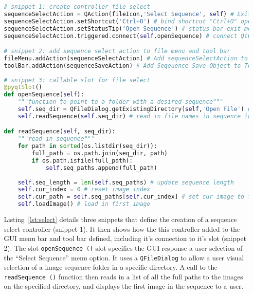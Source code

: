 \begin{lstlisting}[language=Python, caption={Code listing detailing sequence selection controller and connection to slot}, captionpos=b, label={lst:select}]
# snippet 1: create controller file select 
sequenceSelectAction = QAction(fileIcon,'Select Sequence', self) # Exit Action Object
sequenceSelectAction.setShortcut('Ctrl+O') # bind shortcut "Ctrl+O" open file
sequenceSelectAction.setStatusTip('Open Sequence') # status bar exit message
sequenceSelectAction.triggered.connect(self.openSequence) # connect QtGui quit() method 

# snippet 2: add sequence select action to file menu and tool bar
fileMenu.addAction(sequenceSelectAction) # Add sequenceSelectAction to fileMenu 
toolBar.addAction(sequenceSaveAction) # Add Seqeuence Save Object to Tool Bar
    
# snippet 3: callable slot for file select
@pyqtSlot()
def openSequence(self):
    """function to point to a folder with a desired sequence"""
    self.seq_dir = QFileDialog.getExistingDirectory(self,'Open File') # store path to sequence
    self.readSequence(self.seq_dir) # read in file names in sequence into self.paths

def readSequence(self, seq_dir):
    """read in sequence"""
    for path in sorted(os.listdir(seq_dir)):
        full_path = os.path.join(seq_dir, path)
        if os.path.isfile(full_path):
            self.seq_paths.append(full_path)
    
    self.seq_length = len(self.seq_paths) # update sequence length
    self.cur_index = 0 # reset image index
    self.cur_path = self.seq_paths[self.cur_index] # set cur image to first image in self.seq_paths
    self.loadImage() # load in first image
\end{lstlisting}

Listing~\ref{lst:select} details three snippets that define the creation of a
sequence select controller (snippet 1). It then shows how the this controller
added to the GUI menu bar and tool bar
defined, including it's connection to it's slot (snippet 2). The slot
\lstinline{openSequence ()} slot 
specifies the GUI response a user selection of the ``Select Sequence'' menu
option. It uses a \lstinline{QFileDialog} to allow a user visual selection of a image
sequence folder in a specific directory. A call to the \lstinline{readSequence ()}
function then reads in a list of all the full paths to the images on the
specified directory, and displays the first image in the sequence to a user.

